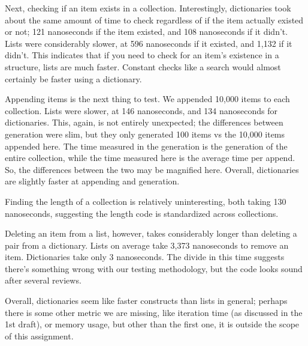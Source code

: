 \documentclass[11pt]{article}
\begin{document}
Next, checking if an item exists in a collection.
Interestingly, dictionaries took about the same amount of time to check regardless of if the item actually existed or not; 121 nanoseconds if the item existed, and 108 nanoseconds if it didn't.
Lists were considerably slower, at 596 nanoseconds if it existed, and 1,132 if it didn't.
This indicates that if you need to check for an item's existence in a structure, lists are much faster.
Constant checks like a search would almost certainly be faster using a dictionary.

Appending items is the next thing to test.
We appended 10,000 items to each collection.
Lists were slower, at 146 nanoseconds, and 134 nanoseconds for dictionaries.
This, again, is not entirely unexpected; the differences between generation were slim, but they only generated 100 items vs the 10,000 items appended here.
The time measured in the generation is the generation of the entire collection, while the time measured here is the average time per append.
So, the differences between the two may be magnified here.
Overall, dictionaries are slightly faster at appending and generation.

Finding the length of a collection is relatively uninteresting, both taking 130 nanoseconds, suggesting the length code is standardized across collections.

Deleting an item from a list, however, takes considerably longer than deleting a pair from a dictionary.
Lists on average take 3,373 nanoseconds to remove an item.
Dictionaries take only 3 nanoseconds.
The divide in this time suggests there's something wrong with our testing methodology, but the code looks sound after several reviews.

Overall, dictionaries seem like faster constructs than lists in general; perhaps there is some other metric we are missing, like iteration time (as discussed in the 1st draft), or memory usage, but other than the first one, it is outside the scope of this assignment.
\end{document}

